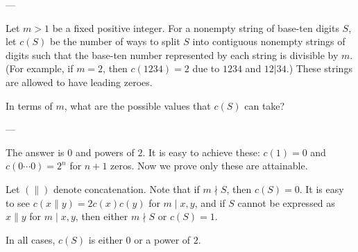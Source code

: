 
---

Let $m>1$ be a fixed positive integer. For a nonempty string of base-ten digits $S$, let $c(S)$ be the number of ways to split $S$ into contiguous nonempty strings of digits such that the base-ten number represented by each string is divisible by $m$. (For example, if $m=2$, then $c(1234)=2$ due to $1234$ and $12|34$.) These strings are allowed to have leading zeroes. 

In terms of $m$, what are the possible values that $c(S)$ can take?

---

The answer is $0$ and powers of $2$. It is easy to achieve these: $c(1)=0$ and $c(0\cdots0)=2^n$ for $n+1$ zeros. Now we prove only these are attainable.

Let $(\|)$ denote concatenation. Note that if $m\nmid S$, then $c(S)=0$. It is easy to see $c(x\|y)=2c(x)c(y)$ for $m\mid x,y$, and if $S$ cannot be expressed as $x\|y$ for $m\mid x,y$, then either $m\nmid S$ or $c(S)=1$.

In all cases, $c(S)$ is either $0$ or a power of $2$.

